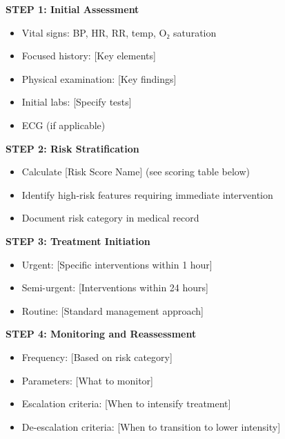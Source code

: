 \documentclass[10pt,letterpaper,landscape]{article}
\begin{document}
\begin{center}
\end{center}

\vspace{8pt}

\begin{tcolorbox}[colback=highlightgray!30,colframe=headerblue,title=\textbf{Detailed Pathway Steps},fonttitle=\bfseries]

\textbf{STEP 1: Initial Assessment}
\begin{itemize}
\item Vital signs: BP, HR, RR, temp, O₂ saturation
\item Focused history: [Key elements]
\item Physical examination: [Key findings]
\item Initial labs: [Specify tests]
\item ECG (if applicable)
\end{itemize}

\textbf{STEP 2: Risk Stratification}
\begin{itemize}
\item Calculate [Risk Score Name] (see scoring table below)
\item Identify high-risk features requiring immediate intervention
\item Document risk category in medical record
\end{itemize}

\textbf{STEP 3: Treatment Initiation}
\begin{itemize}
\item Urgent: [Specific interventions within 1 hour]
\item Semi-urgent: [Interventions within 24 hours]
\item Routine: [Standard management approach]
\end{itemize}

\textbf{STEP 4: Monitoring and Reassessment}
\begin{itemize}
\item Frequency: [Based on risk category]
\item Parameters: [What to monitor]
\item Escalation criteria: [When to intensify treatment]
\item De-escalation criteria: [When to transition to lower intensity]
\end{itemize}

\end{tcolorbox}
\end{document}

